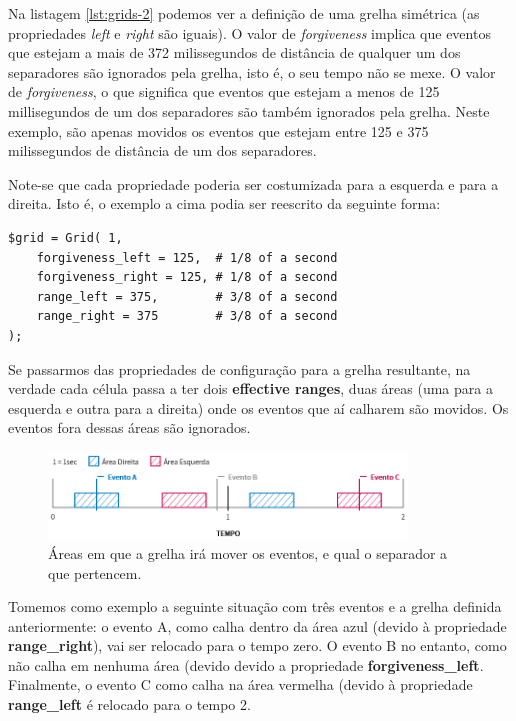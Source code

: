 Na listagem \ref{lst:grids-2} podemos ver a definição de uma grelha simétrica (as propriedades \textit{left} e \textit{right} são iguais). O valor de \textit{forgiveness} implica que eventos que estejam a mais de 372 milissegundos de distância de qualquer um dos separadores são ignorados pela grelha, isto é, o seu tempo não se mexe. O valor de \textit{forgiveness}, o que significa que eventos que estejam a menos de 125 millisegundos de um dos separadores são também ignorados pela grelha. Neste exemplo, são apenas movidos os eventos que estejam entre 125 e 375 milissegundos de distância de um dos separadores.

Note-se que cada propriedade poderia ser costumizada para a esquerda e para a direita. Isto é, o exemplo a cima podia ser reescrito da seguinte forma:

\begin{lstlisting}[caption={Código alternativo de definição da grelha representada na figura \ref{fig:grids-2}, com as propriedades \textit{left} e \textit{right}},label={lst:grids-3}]
$grid = Grid( 1,
    forgiveness_left = 125,  # 1/8 of a second
    forgiveness_right = 125, # 1/8 of a second
    range_left = 375,        # 3/8 of a second
    range_right = 375        # 3/8 of a second
);
\end{lstlisting}

Se passarmos das propriedades de configuração para a grelha resultante, na verdade cada célula passa a ter dois \textbf{effective ranges}, duas áreas (uma para a esquerda e outra para a direita) onde os eventos que aí calharem são movidos. Os eventos fora dessas áreas são ignorados.

\begin{figure}[h]
\begin{center}
    \includegraphics[width=0.85\textwidth]{img/grids_3_1.png}
\end{center}
\vspace*{-5mm}
\caption{Áreas em que a grelha irá mover os eventos, e qual o separador a que pertencem.}
\label{fig:grids-3-1}
\end{figure}

Tomemos como exemplo a seguinte situação com três eventos e a grelha definida anteriormente: o evento A, como calha dentro da área azul (devido à propriedade \textbf{range\_right}), vai ser relocado para o tempo zero. O evento B no entanto, como não calha em nenhuma área (devido devido a propriedade \textbf{forgiveness\_left}. Finalmente, o evento C como calha na área vermelha (devido à propriedade \textbf{range\_left} é relocado para o tempo 2.

